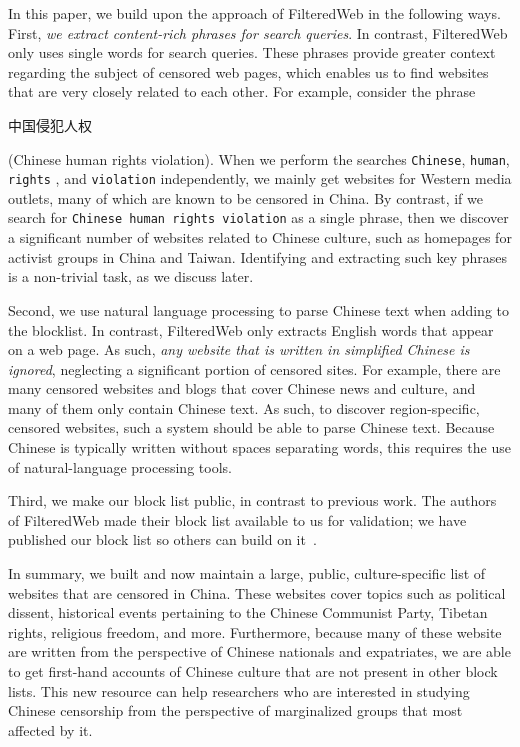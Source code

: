 In this paper, we build upon the approach of FilteredWeb in the
following ways. First, {\em we extract content-rich phrases
for search queries}. In contrast, FilteredWeb only uses single words
for search queries. These phrases provide greater context regarding
the subject of censored web pages, which enables us to find websites
that are very closely related to each other. For example, consider the
phrase \begin{CJK*}{UTF8}{gbsn}中国侵犯人权 \end{CJK*} (Chinese human
rights violation). When we perform the searches \texttt{Chinese},
\texttt{human}, \texttt{rights} , and \texttt{violation}
independently, we mainly get websites for Western media outlets, many
of which are known to be censored in China. By contrast, if we search
for \texttt{Chinese human rights violation} as a single phrase, then
we discover a significant number of websites related to Chinese
culture, such as homepages for activist groups in China and
Taiwan. Identifying and extracting such key phrases is a non-trivial
task, as we discuss later.

Second, we use natural language processing to parse Chinese text
when adding to the blocklist. In contrast, FilteredWeb only extracts English
words that appear on a web page. As such, \textit{any website that is written
in simplified Chinese is ignored}, neglecting a significant portion of
censored sites. For example, there are many censored websites and blogs that
cover Chinese news and culture, and many of them only contain Chinese text. As
such, to discover region-specific, censored websites, such a system should be
able to parse Chinese text. Because Chinese is typically written without
spaces separating words, this requires the use of natural-language processing
tools.

Third, we make our block list public, in contrast to previous work. The
authors of FilteredWeb made their block list available to us for validation;
we have published our block list so others can build on
it~\cite{censorsearch-lists}.

In summary, we built and now maintain a large, public, culture-specific list
of websites that are censored in China. These websites cover topics such as
political dissent, historical events pertaining to the Chinese Communist
Party, Tibetan rights, religious freedom, and more. Furthermore, because many
of these website are written from the perspective of Chinese nationals and expatriates,
we are able to get first-hand accounts of Chinese culture that are
not present in other block lists. This new resource can help researchers who
are interested in studying Chinese censorship from the perspective of
marginalized groups that most affected by it.

